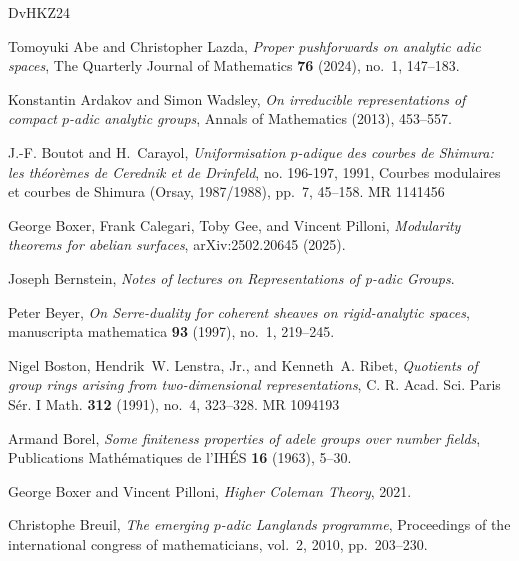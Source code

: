 \documentclass{article}
\theoremstyle{definition}
\begin{document}
\providecommand{\bysame}{\leavevmode\hbox to3em{\hrulefill}\thinspace}
\providecommand{\MR}{\relax\ifhmode\unskip\space\fi MR }
\providecommand{\MRhref}[2]{%
  \href{http://www.ams.org/mathscinet-getitem?mr=#1}{#2}
}
\providecommand{\href}[2]{#2}
\begin{thebibliography}{DvHKZ24}

Tomoyuki Abe and Christopher Lazda, \emph{Proper pushforwards on analytic adic spaces}, The Quarterly Journal of Mathematics \textbf{76} (2024), no.~1, 147--183.

Konstantin Ardakov and Simon Wadsley, \emph{On irreducible representations of compact $p$-adic analytic groups}, Annals of Mathematics (2013), 453--557.

J.-F. Boutot and H.~Carayol, \emph{{Uniformisation {$p$}-adique des courbes de {S}himura: les th\'eor\`emes de Cerednik et de {D}rinfeld}}, no. 196-197, 1991, Courbes modulaires et courbes de Shimura (Orsay, 1987/1988), pp.~7, 45--158. \MR{1141456}

George Boxer, Frank Calegari, Toby Gee, and Vincent Pilloni, \emph{{Modularity theorems for abelian surfaces}}, arXiv:2502.20645 (2025).

Joseph Bernstein, \emph{{Notes of lectures on Representations of p-adic Groups}}.

Peter Beyer, \emph{{On Serre-duality for coherent sheaves on rigid-analytic spaces}}, manuscripta mathematica \textbf{93} (1997), no.~1, 219--245.

Nigel Boston, Hendrik~W. Lenstra, Jr., and Kenneth~A. Ribet, \emph{Quotients of group rings arising from two-dimensional representations}, C. R. Acad. Sci. Paris S\'er. I Math. \textbf{312} (1991), no.~4, 323--328. \MR{1094193}

Armand Borel, \emph{Some finiteness properties of adele groups over number fields}, Publications Math{\'e}matiques de l'IH{\'E}S \textbf{16} (1963), 5--30.

George Boxer and Vincent Pilloni, \emph{{Higher Coleman Theory}}, 2021.

Christophe Breuil, \emph{{The emerging $p$-adic Langlands programme}}, Proceedings of the international congress of mathematicians, vol.~2, 2010, pp.~203--230.


\end{thebibliography}
\end{document}
